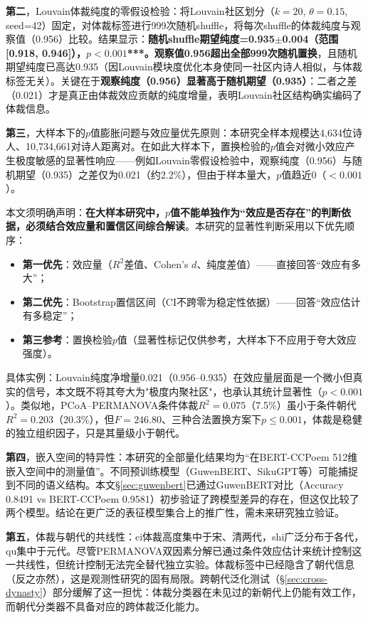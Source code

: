 \documentclass[12pt,a4paper]{article}
\numberwithin{equation}{section}
\begin{document}
\textbf{第二}，Louvain体裁纯度的零假设检验：将Louvain社区划分（$k=20$, $\theta=0.15$, seed=42）固定，对体裁标签进行999次随机shuffle，将每次shuffle的体裁纯度与观察值（0.956）比较。结果显示：\textbf{随机shuffle期望纯度=0.935$\pm$0.004（范围[0.918, 0.946]），$p<0.001$***。观察值0.956超出全部999次随机置换}，且随机期望纯度已高达0.935（因Louvain模块度优化本身使同一社区内诗人相似，与体裁标签无关）。关键在于\textbf{观察纯度（0.956）显著高于随机期望（0.935）}：二者之差（0.021）才是真正由体裁效应贡献的纯度增量，表明Louvain社区结构确实编码了体裁信息。

\textbf{第三}，大样本下的$p$值膨胀问题与效应量优先原则：本研究全样本规模达4,634位诗人、10,734,661对诗人距离对。在如此大样本下，置换检验的$p$值会对微小效应产生极度敏感的显著性响应——例如Louvain零假设检验中，观察纯度（0.956）与随机期望（0.935）之差仅为0.021（约2.2\%），但由于样本量大，$p$值趋近0（$<0.001$）。

本文须明确声明：\textbf{在大样本研究中，$p$值不能单独作为“效应是否存在”的判断依据，必须结合效应量和置信区间综合解读}。本研究的显著性判断采用以下优先顺序：
\begin{itemize}
  \item \textbf{第一优先}：效应量（$R^{2}$差值、Cohen's $d$、纯度差值）——直接回答“效应有多大”；
  \item \textbf{第二优先}：Bootstrap置信区间（CI不跨零为稳定性依据）——回答“效应估计有多稳定”；
  \item \textbf{第三参考}：置换检验$p$值（显著性标记仅供参考，大样本下不应用于夸大效应强度）。
\end{itemize}
具体实例：Louvain纯度净增量0.021（0.956--0.935）在效应量层面是一个微小但真实的信号，本文既不将其夸大为"极度内聚社区"，也承认其统计显著性（$p<0.001$）。类似地，PCoA--PERMANOVA条件体裁$R^{2}=0.075$（7.5\%）虽小于条件朝代$R^{2}=0.203$（20.3\%），但$F=246.80$、三种合法置换方案下$p\leq0.001$，体裁是稳健的独立组织因子，只是其量级小于朝代。

\textbf{第四}，嵌入空间的特异性：本研究的全部量化结果均为“在BERT-CCPoem 512维嵌入空间中的测量值”。不同预训练模型（GuwenBERT、SikuGPT等）可能捕捉到不同的语义结构。本文§\ref{sec:guwenbert}已通过GuwenBERT对比（Accuracy 0.8491 vs BERT-CCPoem 0.9581）初步验证了跨模型差异的存在，但这仅比较了两个模型。结论在更广泛的表征模型集合上的推广性，需未来研究独立验证。

\textbf{第五}，体裁与朝代的共线性：ci体裁高度集中于宋、清两代，shi广泛分布于各代，qu集中于元代。尽管PERMANOVA双因素分解已通过条件效应估计来统计控制这一共线性，但统计控制无法完全替代独立实验。体裁标签中已经隐含了朝代信息（反之亦然），这是观测性研究的固有局限。跨朝代泛化测试（§\ref{sec:cross-dynasty}）部分缓解了这一担忧：体裁分类器在未见过的新朝代上仍能有效工作，而朝代分类器不具备对应的跨体裁泛化能力。
\end{document}
